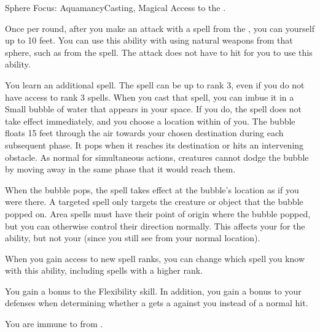   \begin{magicalfeat}{Sphere Focus: Aquamancy}{Casting, Magical}
    \featpre Access to the  .

     Once per round, after you make an attack with a spell from the  , you can  yourself up to 10 feet.
    You can use this ability with  using natural weapons from that sphere, such as from the  spell.
    The attack does not have to hit for you to use this ability.

     You learn an additional spell.
    The spell can be up to rank 3, even if you do not have access to rank 3 spells.
    When you cast that spell, you can imbue it in a Small bubble of water that appears in your space.
    If you do, the spell does not take effect immediately, and you choose a location within \medrange of you.
    The bubble floats 15 feet through the air towards your chosen destination during each subsequent phase.
    It pops when it reaches its destination or hits an intervening obstacle.
    As normal for simultaneous actions, creatures cannot dodge the bubble by moving away in the same phase that it would reach them.

    When the bubble pops, the spell takes effect at the bubble's location as if you were there.
    A targeted spell only targets the creature or object that the bubble popped on.
    Area spells must have their point of origin where the bubble popped, but you can otherwise control their direction normally.
    This affects your  for the ability, but not your  (since you still see from your normal location).

    When you gain access to new spell ranks, you can change which spell you know with this ability, including spells with a higher rank.

     You gain a  bonus to the Flexibility skill.
    In addition, you gain a  bonus to your defenses when determining whether a  gets a  against you instead of a normal hit.

     You are immune to  from .
  \end{magicalfeat}

